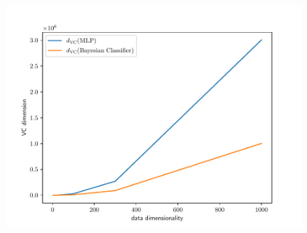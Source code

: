 \documentclass{exam}
\begin{document}
\begin{questions}
\begin{parts}
            \begin{figure}[H]
                \centering
                \includegraphics[scale = 0.75]{vc_4_b.pdf}
            \end{figure}
        \end{parts}
    \end{questions}
\end{document}
